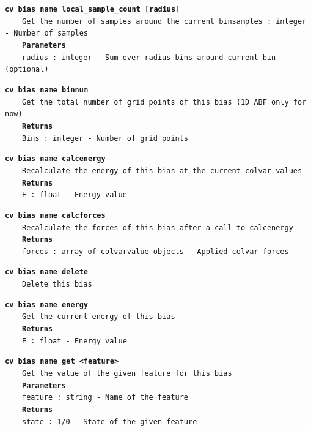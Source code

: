\begin{mdexampleinput}{}
\texttt{\textbf{cv bias name local\_sample\_count [radius]}}
\\
\-~~~~\texttt{Get the number of samples around the current binsamples : integer - Number of samples}
\\
\-~~~~\texttt{\textbf{Parameters}}
\\
\-~~~~\texttt{radius : integer - Sum over radius bins around current bin (optional)}
\end{mdexampleinput}
\begin{mdexampleinput}{}
\texttt{\textbf{cv bias name binnum}}
\\
\-~~~~\texttt{Get the total number of grid points of this bias (1D ABF only for now)}
\\
\-~~~~\texttt{\textbf{Returns}}
\\
\-~~~~\texttt{Bins : integer - Number of grid points}
\end{mdexampleinput}
\begin{mdexampleinput}{}
\texttt{\textbf{cv bias name calcenergy}}
\\
\-~~~~\texttt{Recalculate the energy of this bias at the current colvar values}
\\
\-~~~~\texttt{\textbf{Returns}}
\\
\-~~~~\texttt{E : float - Energy value}
\end{mdexampleinput}
\begin{mdexampleinput}{}
\texttt{\textbf{cv bias name calcforces}}
\\
\-~~~~\texttt{Recalculate the forces of this bias after a call to calcenergy}
\\
\-~~~~\texttt{\textbf{Returns}}
\\
\-~~~~\texttt{forces : array of colvarvalue objects - Applied colvar forces}
\end{mdexampleinput}
\begin{mdexampleinput}{}
\texttt{\textbf{cv bias name delete}}
\\
\-~~~~\texttt{Delete this bias}
\end{mdexampleinput}
\begin{mdexampleinput}{}
\texttt{\textbf{cv bias name energy}}
\\
\-~~~~\texttt{Get the current energy of this bias}
\\
\-~~~~\texttt{\textbf{Returns}}
\\
\-~~~~\texttt{E : float - Energy value}
\end{mdexampleinput}
\begin{mdexampleinput}{}
\texttt{\textbf{cv bias name get <feature>}}
\\
\-~~~~\texttt{Get the value of the given feature for this bias}
\\
\-~~~~\texttt{\textbf{Parameters}}
\\
\-~~~~\texttt{feature : string - Name of the feature}
\\
\-~~~~\texttt{\textbf{Returns}}
\\
\-~~~~\texttt{state : 1/0 - State of the given feature}
\end{mdexampleinput}
